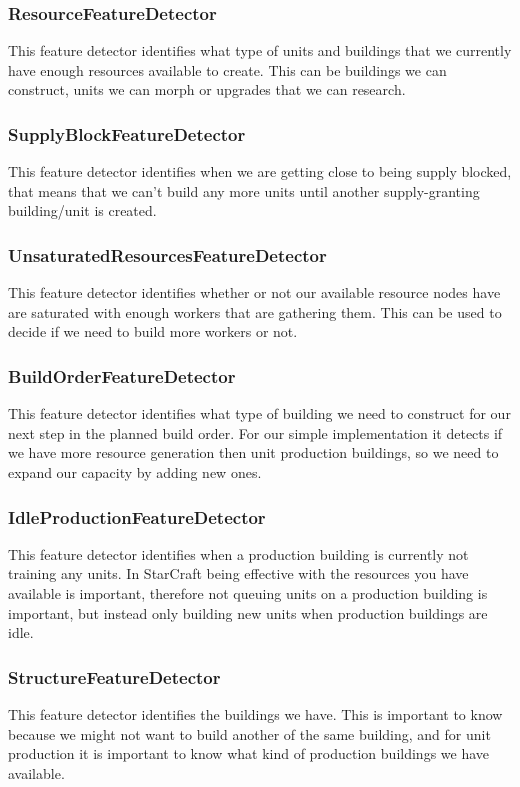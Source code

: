 \subsubsection{ResourceFeatureDetector}
This feature detector identifies what type of units and buildings that we currently have enough resources available to create. This can be buildings we can construct, units we can morph or upgrades that we can research. 

\subsubsection{SupplyBlockFeatureDetector}
This feature detector identifies when we are getting close to being supply blocked, that means that we can't build any more units until another supply-granting building/unit is created.

\subsubsection{UnsaturatedResourcesFeatureDetector}
This feature detector identifies whether or not our available resource nodes have are saturated with enough workers that are gathering them. This can be used to decide if we need to build more workers or not.

\subsubsection{BuildOrderFeatureDetector}
This feature detector identifies what type of building we need to construct for our next step in the planned build order. For our simple implementation it detects if we have more resource generation then unit production buildings, so we need to expand our capacity by adding new ones. 

\subsubsection{IdleProductionFeatureDetector}
This feature detector identifies when a production building is currently not training any units. In StarCraft being effective with the resources you have available is important, therefore not queuing units on a production building is important, but instead only building new units when production buildings are idle.

\subsubsection{StructureFeatureDetector}
This feature detector identifies the buildings we have. This is important to know because we might not want to build another of the same building, and for unit production it is important to know what kind of production buildings we have available.

